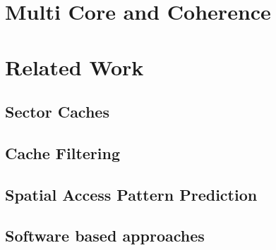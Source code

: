 \section{Multi Core and Coherence}

\section{Related Work}
\subsection{Sector Caches}
\subsection{Cache Filtering}
\subsection{Spatial Access Pattern Prediction}
\subsection{Software based approaches}